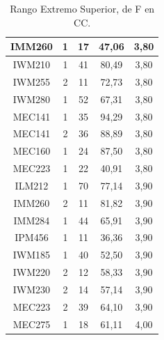 \documentclass[12pt]{article}
\begin{document}
\begin{table}[H]
{{\begin{minipage}[b]{.5\hsize}
{\begin{tabular}{|c|c|c|c|c|}
            \rowcolor[HTML]{DAEBFB} 
            IMM260 & 1 & 17 & 47,06 & 3,80 \\ \hline
            \rowcolor[HTML]{DAEBFB} 
            IWM210 & 1 & 41 & 80,49 & 3,80 \\ \hline
            \rowcolor[HTML]{DAEBFB} 
            IWM255 & 2 & 11 & 72,73 & 3,80 \\ \hline
            \rowcolor[HTML]{DAEBFB} 
            IWM280 & 1 & 52 & 67,31 & 3,80 \\ \hline
            \rowcolor[HTML]{DAEBFB} 
            MEC141 & 1 & 35 & 94,29 & 3,80 \\ \hline
            \rowcolor[HTML]{DAEBFB} 
            MEC141 & 2 & 36 & 88,89 & 3,80 \\ \hline
            \rowcolor[HTML]{DAEBFB} 
            MEC160 & 1 & 24 & 87,50 & 3,80 \\ \hline
            \rowcolor[HTML]{DAEBFB} 
            MEC223 & 1 & 22 & 40,91 & 3,80 \\ \hline
            \rowcolor[HTML]{DAEBFB} 
            ILM212 & 1 & 70 & 77,14 & 3,90 \\ \hline
            \rowcolor[HTML]{DAEBFB} 
            IMM260 & 2 & 11 & 81,82 & 3,90 \\ \hline
            \rowcolor[HTML]{DAEBFB} 
            IMM284 & 1 & 44 & 65,91 & 3,90 \\ \hline
            \rowcolor[HTML]{DAEBFB} 
            IPM456 & 1 & 11 & 36,36 & 3,90 \\ \hline
            \rowcolor[HTML]{DAEBFB} 
            IWM185 & 1 & 40 & 52,50 & 3,90 \\ \hline
            \rowcolor[HTML]{DAEBFB} 
            IWM220 & 2 & 12 & 58,33 & 3,90 \\ \hline
            \rowcolor[HTML]{DAEBFB} 
            IWM230 & 2 & 14 & 57,14 & 3,90 \\ \hline
            \rowcolor[HTML]{DAEBFB} 
            MEC223 & 2 & 39 & 64,10 & 3,90 \\ \hline
            \rowcolor[HTML]{DAEBFB} 
            MEC275 & 1 & 18 & 61,11 & 4,00 \\ \hline
        \end{tabular}}
        \caption{Rango Extremo Superior, de F en CC.}
    \end{minipage}\hfil
}}
\end{table}
\pagebreak


\end{document}
